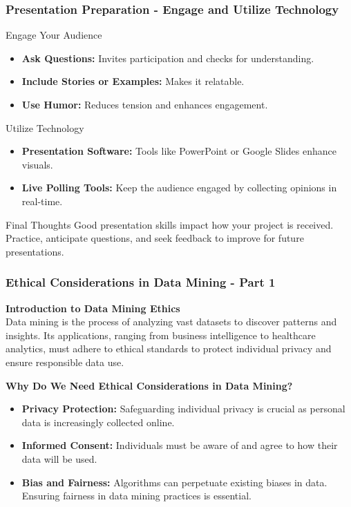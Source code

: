 \documentclass[aspectratio=169]{beamer}
\begin{document}
\begin{frame}[fragile]
    \frametitle{Presentation Preparation - Engage and Utilize Technology}
    \begin{block}{Engage Your Audience}
        \begin{itemize}
            \item \textbf{Ask Questions:} Invites participation and checks for understanding. 
            \item \textbf{Include Stories or Examples:} Makes it relatable.
            \item \textbf{Use Humor:} Reduces tension and enhances engagement.
        \end{itemize}
    \end{block}

    \begin{block}{Utilize Technology}
        \begin{itemize}
            \item \textbf{Presentation Software:} Tools like PowerPoint or Google Slides enhance visuals.
            \item \textbf{Live Polling Tools:} Keep the audience engaged by collecting opinions in real-time.
        \end{itemize}
    \end{block}

    \begin{block}{Final Thoughts}
        Good presentation skills impact how your project is received. Practice, anticipate questions, and seek feedback to improve for future presentations.
    \end{block}
\end{frame}

\begin{frame}[fragile]
    \frametitle{Ethical Considerations in Data Mining - Part 1}
    \textbf{Introduction to Data Mining Ethics}\\
    Data mining is the process of analyzing vast datasets to discover patterns and insights. Its applications, ranging from business intelligence to healthcare analytics, must adhere to ethical standards to protect individual privacy and ensure responsible data use.
    
    \textbf{Why Do We Need Ethical Considerations in Data Mining?}
    \begin{itemize}
        \item \textbf{Privacy Protection:} Safeguarding individual privacy is crucial as personal data is increasingly collected online.
        \item \textbf{Informed Consent:} Individuals must be aware of and agree to how their data will be used.
        \item \textbf{Bias and Fairness:} Algorithms can perpetuate existing biases in data. Ensuring fairness in data mining practices is essential.
    \end{itemize}
\end{frame}
\end{document}
